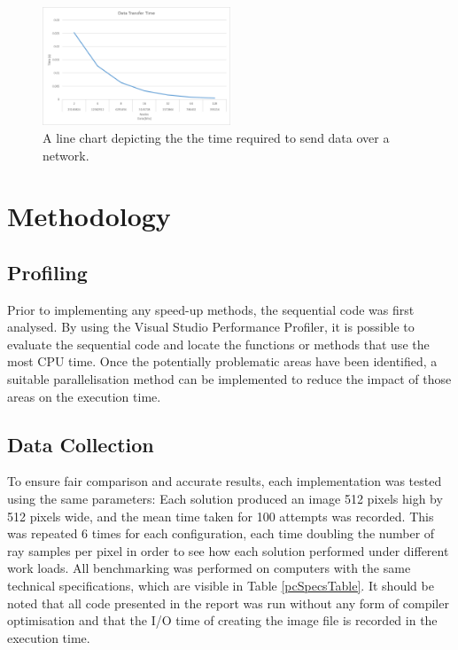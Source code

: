 \documentclass[journal,transmag]{IEEEtran}
\begin{document}
		\begin{figure}[]
			\centering
			\includegraphics[width = 0.5\textwidth]{chartNetwork}
			\caption{A line chart depicting the the time required to send data over a network.}
			\label{fig_network}
		\end{figure}
		
\section{Methodology}
		
	\subsection{Profiling}
		Prior to implementing any speed-up methods, the sequential code was first analysed. By using the Visual Studio Performance Profiler, it is possible to evaluate the sequential code and locate the functions or methods that use the most CPU time. Once the potentially problematic areas have been identified, a suitable parallelisation method can be implemented to reduce the impact of those areas on the execution time. 
		
	\subsection{Data Collection}
		To ensure fair comparison and accurate results, each implementation was tested using the same parameters: Each solution produced an image 512 pixels high by 512 pixels wide, and the mean time taken for 100 attempts was recorded. This was repeated 6 times for each configuration, each time doubling the number of ray samples per pixel in order to see how each solution performed under different work loads. All benchmarking was performed on computers with the same technical specifications, which are visible in Table \ref{pcSpecsTable}. It should be noted that all code presented in the report was run without any form of compiler optimisation and that the I/O time of creating the image file is recorded in the execution time.
		
\end{document}
